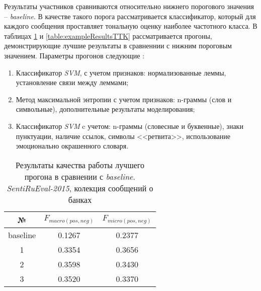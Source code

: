     Результаты участников сравниваются относительно нижнего порогового значения -- {\it baseline}.
    В качестве такого порога рассматривается классификатор, который для каждого
    сообщения проставляет тональную оценку наиболее частотного класса. В таблицах
    \ref{table:exampleResultsBanks} и \ref{table:exampleResultsTTK} рассматривается
    прогоны, демонстрирующие лучшие результаты в сравненнии с нижним пороговым
    значением. Параметры прогонов следующие \cite{tonalityanalisys}:
    \begin{enumerate}
        \item Классификатор {\it SVM}, с учетом признаков:
            нормализованные леммы, установление связи между леммами;
        \item Метод максимальной энтропии с учетом признаков:
            n-граммы (слов и символьные), дополнительные результаты моделирования;
        \item Классификатор {\it SVM} c учетом: n-граммы (словесные и буквенные),
            знаки пунктуации, наличие ссылок, символы <<ретвита>>, использование
            эмоционально окрашенного словаря.
    \end{enumerate}

    \begin{table}[H]
        \centering
        \caption{Результаты качества работы лучшего прогона в сравнении с {\it baseline}.
        {\it SentiRuEval-2015}, колекция сообщений о банках}
        \label{table:exampleResultsBanks}
        \begin{tabular}{|c|c|c|}
        \hline
        №                       &       $F_{macro(pos, neg)}$        & $F_{micro(pos, neg)}$  \\ \hline
        baseline                &           0.1267                      &       0.2377              \\ \hline \hline
        1                       &           0.3354                      &       0.3656              \\ \hline
        2                       &           0.3598                      &       0.3430              \\ \hline
        3                       &           0.3520                      &       0.3370              \\ \hline
        \end{tabular}
     \end{table}

